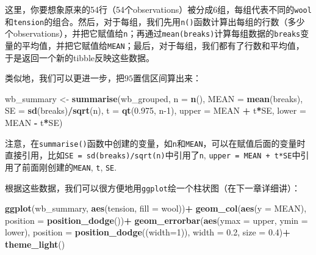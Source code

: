 \documentclass[]{book}
\newenvironment{Shaded}{\begin{snugshade}}{\end{snugshade}}
\newcommand{\DataTypeTok}[1]{\textcolor[rgb]{0.13,0.29,0.53}{#1}}
\newcommand{\DecValTok}[1]{\textcolor[rgb]{0.00,0.00,0.81}{#1}}
\newcommand{\FloatTok}[1]{\textcolor[rgb]{0.00,0.00,0.81}{#1}}
\newcommand{\KeywordTok}[1]{\textcolor[rgb]{0.13,0.29,0.53}{\textbf{#1}}}
\newcommand{\NormalTok}[1]{#1}
\newcommand{\OperatorTok}[1]{\textcolor[rgb]{0.81,0.36,0.00}{\textbf{#1}}}
\newcommand{\StringTok}[1]{\textcolor[rgb]{0.31,0.60,0.02}{#1}}
\begin{document}
这里，你要想象原来的54行（54个observations）被分成6组，每组代表不同的\texttt{wool}和\texttt{tension}的组合。然后，对于每组，我们先用\texttt{n()}函数计算出每组的行数（多少个observations），并把它赋值给\texttt{n}；再通过\texttt{mean(breaks)}计算每组数据的\texttt{breaks}变量的平均值，并把它赋值给\texttt{MEAN}；最后，对于每组，我们都有了行数和平均值，于是返回一个新的tibble反映这些数据。

类似地，我们可以更进一步，把\(95%
\)置信区间算出来：

\begin{Shaded}
\begin{Highlighting}[]
\NormalTok{wb_summary <-}\StringTok{ }\KeywordTok{summarise}\NormalTok{(wb_grouped, }
          \DataTypeTok{n =} \KeywordTok{n}\NormalTok{(), }
          \DataTypeTok{MEAN =} \KeywordTok{mean}\NormalTok{(breaks), }
          \DataTypeTok{SE =} \KeywordTok{sd}\NormalTok{(breaks)}\OperatorTok{/}\KeywordTok{sqrt}\NormalTok{(n),}
          \DataTypeTok{t =} \KeywordTok{qt}\NormalTok{(}\FloatTok{0.975}\NormalTok{, n}\DecValTok{-1}\NormalTok{),}
          \DataTypeTok{upper =}\NormalTok{ MEAN }\OperatorTok{+}\StringTok{ }\NormalTok{t}\OperatorTok{*}\NormalTok{SE,}
          \DataTypeTok{lower =}\NormalTok{ MEAN }\OperatorTok{-}\StringTok{ }\NormalTok{t}\OperatorTok{*}\NormalTok{SE)}
\end{Highlighting}
\end{Shaded}

注意，在\texttt{summarise()}函数中创建的变量，如\texttt{n}和\texttt{MEAN}，可以在赋值后面的变量时直接引用，比如\texttt{SE\ =\ sd(breaks)/sqrt(n)}中引用了\texttt{n}, \texttt{upper\ =\ MEAN\ +\ t*SE}中引用了前面刚创建的\texttt{MEAN}, \texttt{t}, \texttt{SE}.

根据这些数据，我们可以很方便地用\texttt{ggplot}绘一个柱状图（在下一章详细讲）：

\begin{Shaded}
\begin{Highlighting}[]
\KeywordTok{ggplot}\NormalTok{(wb_summary, }\KeywordTok{aes}\NormalTok{(tension, }\DataTypeTok{fill =}\NormalTok{ wool))}\OperatorTok{+}
\StringTok{  }\KeywordTok{geom_col}\NormalTok{(}\KeywordTok{aes}\NormalTok{(}\DataTypeTok{y =}\NormalTok{ MEAN), }\DataTypeTok{position =} \KeywordTok{position_dodge}\NormalTok{())}\OperatorTok{+}
\StringTok{  }\KeywordTok{geom_errorbar}\NormalTok{(}\KeywordTok{aes}\NormalTok{(}\DataTypeTok{ymax =}\NormalTok{ upper, }\DataTypeTok{ymin =}\NormalTok{ lower), }\DataTypeTok{position =} \KeywordTok{position_dodge}\NormalTok{((}\DataTypeTok{width=}\DecValTok{1}\NormalTok{)), }\DataTypeTok{width =} \FloatTok{0.2}\NormalTok{, }\DataTypeTok{size =} \FloatTok{0.4}\NormalTok{)}\OperatorTok{+}
\StringTok{  }\KeywordTok{theme_light}\NormalTok{()}
\end{Highlighting}
\end{Shaded}
\end{document}
